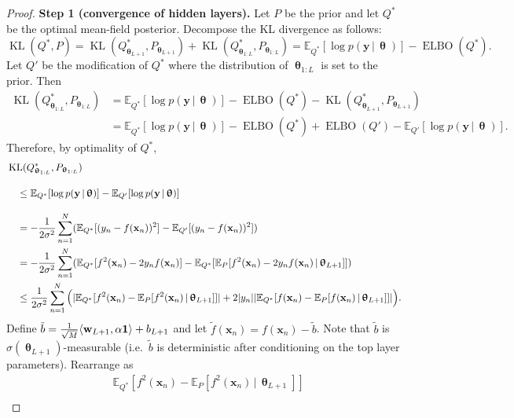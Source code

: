 \documentclass[twoside]{article}
\newcommand{\vw}{\mathbf{w}}
\newcommand{\vx}{\mathbf{x}}
\newcommand{\vy}{\mathbf{y}}
\newcommand{\vtheta}{\bm{\uptheta}}
\newcommand{\vone}{\mathbf{1}}
\newcommand{\E}{\mathbb{E}}
\newcommand{\KL}{\operatorname{KL}}
\newcommand{\cond}{\,|\,}                  %
\DeclarePairedDelimiter\lra{\langle}{\rangle}    %
\DeclarePairedDelimiter\abs{|}{|}                %
\theoremstyle{theoremstyle}
\begin{document}
\begin{proof}
    \textbf{Step 1 (convergence of hidden layers).}
    Let $P$ be the prior and let $Q^*$ be the optimal mean-field posterior.
    Decompose the KL divergence as follows:
    \begin{equation}
        \KL(Q^*, P)
        = \KL(Q^*_{\vtheta_{L+1}}, P_{\vtheta_{L+1}}) + \KL(Q^*_{\vtheta_{1:L}}, P_{\vtheta_{1:L}})
        = \E_{Q^*}[\log p(\vy \cond \vtheta)] - \operatorname{ELBO}(Q^*).
    \end{equation}
    Let $Q'$ be the modification of $Q^*$ where the distribution of $\vtheta_{1:L}$ is set to the prior.
    Then
    \begin{align}
        \KL(Q^*_{\vtheta_{1:L}}, P_{\vtheta_{1:L}})
        &=
            \E_{Q^*}[\log p(\vy \cond \vtheta)]
            - \operatorname{ELBO}(Q^*)
            - \KL(Q^*_{\vtheta_{L+1}}, P_{\vtheta_{L+1}}) \\
        &=
            \E_{Q^*}[\log p(\vy \cond \vtheta)]
            - \operatorname{ELBO}(Q^*)
            + \operatorname{ELBO}(Q')
            - \E_{Q'}[\log p(\vy \cond \vtheta)].
    \end{align}
    Therefore, by optimality of $Q^*$,
    \begin{align}
        &\KL(Q^*_{\vtheta_{1:L}}, P_{\vtheta_{1:L}}) \nonumber \\
        &\quad\le\vphantom{\sum^N_{n}} \E_{Q^*}[\log p(\vy \cond \vtheta)] - \E_{Q'}[\log p(\vy \cond \vtheta)] \\
        &\quad= -\frac1{2\sigma^2}\sum_{n=1}^N(
            \E_{Q^*}[(y_n - f(\vx_n))^2]
            - \E_{Q'}[(y_n - f(\vx_n))^2]
        ) \\
        &\quad= -\frac1{2\sigma^2}\sum_{n=1}^N(
            \E_{Q^*}[f^2(\vx_n) - 2 y_n f(\vx_n) ]
            - \E_{Q^*}[\E_{P}[f^2(\vx_n) - 2 y_n f(\vx_n) \cond \vtheta_{L+1}]]
        ) \\
        &\quad\le \frac1{2\sigma^2}\sum_{n=1}^N\Big(
            \abs{\E_{Q^*}[f^2(\vx_n) -\E_{P}[f^2(\vx_n)\cond \vtheta_{L+1}]]}
            + 2 \abs{y_n} \abs{\E_{Q^*}[f(\vx_n) -\E_{P}[f(\vx_n)\cond \vtheta_{L+1}]]}
        \Big).
    \end{align}
    Define $\tilde b = \tfrac1{\sqrt{M}}\lra{\vw_{L+1}, \alpha \vone} + b_{L+1}$
    and let $\tilde f(\vx_n) = f(\vx_n) - \tilde b$.
    Note that $\tilde b$ is $\sigma(\vtheta_{L+1})$-measurable (i.e.~$\tilde b$ is deterministic after conditioning on the top layer parameters).
    Rearrange as
    \begin{align}
        &\E_{Q^*}[f^2(\vx_n) -\E_{P}[f^2(\vx_n)\cond \vtheta_{L+1}]] \nonumber \\

\end{align}
\end{proof}
\end{document}
